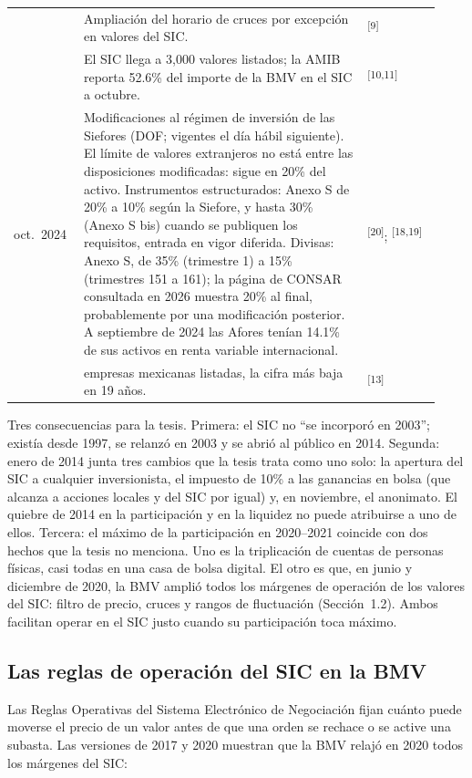 \documentclass[11pt,letterpaper]{article}
\theoremstyle{definition}
\theoremstyle{plain}
\newcommand{\web}[1]{\textsuperscript{[#1]}}
\begin{document}
\begin{center}
\begin{longtable}{@{}>{\raggedright\arraybackslash}p{0.15\linewidth}>{\raggedright\arraybackslash}p{0.62\linewidth}>{\raggedright\arraybackslash}p{0.16\linewidth}@{}}
2021 & Ampliación del horario de cruces por excepción en valores del SIC. & \web{9}\\
2021 & El SIC llega a 3,000 valores listados; la AMIB reporta 52.6\% del importe de la BMV en el SIC a octubre. & \web{10,11}\\
25 oct.\ 2024 & Modificaciones al régimen de inversión de las Siefores (DOF; vigentes el día hábil siguiente). El límite de valores extranjeros no está entre las disposiciones modificadas: sigue en 20\% del activo. Instrumentos estructurados: Anexo S de 20\% a 10\% según la Siefore, y hasta 30\% (Anexo S bis) cuando se publiquen los requisitos, entrada en vigor diferida. Divisas: Anexo S, de 35\% (trimestre 1) a 15\% (trimestres 151 a 161); la página de CONSAR consultada en 2026 muestra 20\% al final, probablemente por una modificación posterior. A septiembre de 2024 las Afores tenían 14.1\% de sus activos en renta variable internacional. & \web{20}; \web{18,19}\\
2025 & 128 empresas mexicanas listadas, la cifra más baja en 19 años. & \web{13}\\\bottomrule
\end{longtable}
\end{center}

Tres consecuencias para la tesis. Primera: el SIC no ``se incorporó en 2003''; existía desde 1997, se relanzó en 2003 y se abrió al público en 2014. Segunda: enero de 2014 junta tres cambios que la tesis trata como uno solo: la apertura del SIC a cualquier inversionista, el impuesto de 10\% a las ganancias en bolsa (que alcanza a acciones locales y del SIC por igual) y, en noviembre, el anonimato. El quiebre de 2014 en la participación y en la liquidez no puede atribuirse a uno de ellos. Tercera: el máximo de la participación en 2020--2021 coincide con dos hechos que la tesis no menciona. Uno es la triplicación de cuentas de personas físicas, casi todas en una casa de bolsa digital. El otro es que, en junio y diciembre de 2020, la BMV amplió todos los márgenes de operación de los valores del SIC: filtro de precio, cruces y rangos de fluctuación (Sección~1.2). Ambos facilitan operar en el SIC justo cuando su participación toca máximo.

\subsection{Las reglas de operación del SIC en la BMV}
Las Reglas Operativas del Sistema Electrónico de Negociación fijan cuánto puede moverse el precio de un valor antes de que una orden se rechace o se active una subasta. Las versiones de 2017 y 2020 muestran que la BMV relajó en 2020 todos los márgenes del SIC:
\end{document}
